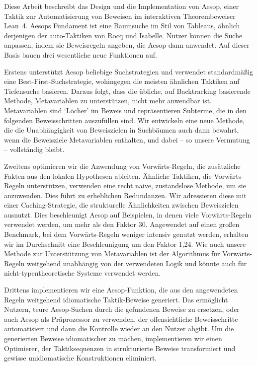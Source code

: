 {

Diese Arbeit beschreibt das Design und die Implementation von Aesop, einer Taktik zur Automatisierung von Beweisen im interaktiven Theorembeweiser Lean~4.
Aesops Fundament ist eine Baumsuche im Stil von Tableaus, ähnlich derjenigen der auto-Taktiken von Rocq und Isabelle.
Nutzer können die Suche anpassen, indem sie Beweisregeln angeben, die Aesop dann anwendet.
Auf dieser Basis bauen drei wesentliche neue Funktionen auf.

Erstens unterstützt Aesop beliebige Suchstrategien und verwendet standardmäßig eine Best-First-Suchstrategie, wohingegen die meisten ähnlichen Taktiken auf Tiefensuche basieren.
Daraus folgt, dass die übliche, auf Backtracking basierende Methode, Metavariablen zu unterstützen, nicht mehr anwendbar ist.
Metavariablen sind \enquote*{Löcher} im Beweis und repräsentieren Subterme, die in den folgenden Beweisschritten auszufüllen sind.
Wir entwickeln eine neue Methode, die die Unabhängigkeit von Beweiszielen in Suchbäumen auch dann bewahrt, wenn die Beweisziele Metavariablen enthalten, und dabei -- so unsere Vermutung -- vollständig bleibt.

Zweitens optimieren wir die Anwendung von Vorwärts-Regeln, die zusätzliche Fakten aus den lokalen Hypothesen ableiten.
Ähnliche Taktiken, die Vorwärts-Regeln unterstützen, verwenden eine recht naive, zustandslose Methode, um sie anzuwenden.
Dies führt zu erheblichen Redundanzen.
Wir adressieren diese mit einer Caching-Strategie, die strukturelle Ähnlichkeiten zwischen Beweiszielen ausnutzt.
Dies beschleunigt Aesop auf Beispielen, in denen viele Vorwärts-Regeln verwendet werden, um mehr als den Faktor 30.
Angewendet auf einen großen Benchmark, bei dem Vorwärts-Regeln weniger intensiv genutzt werden, erhalten wir im Durchschnitt eine Beschleunigung um den Faktor 1,24.
Wie auch unsere Methode zur Unterstützung von Metavariablen ist der Algorithmus für Vorwärts-Regeln weitgehend unabhängig von der verwendeten Logik und könnte auch für nicht-typentheoretische Systeme verwendet werden.

Drittens implementieren wir eine Aesop-Funktion, die aus den angewendeten Regeln weitgehend idiomatische Taktik-Beweise generiert.
Das ermöglicht Nutzern, teure Aesop-Suchen durch die gefundenen Beweise zu ersetzen, oder auch Aesop als Präprozessor zu verwenden, der offensichtliche Beweisschritte automatisiert und dann die Kontrolle wieder an den Nutzer abgibt.
Um die generierten Beweise idiomatischer zu machen, implementieren wir einen Optimierer, der Taktiksequenzen in strukturierte Beweise transformiert und gewisse unidiomatische Konstruktionen eliminiert.
}
